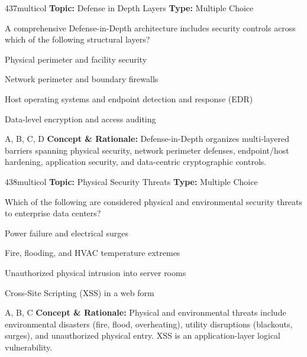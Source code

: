 \begin{qcard}{437}{multicol}
\textcolor{darkslate!75}{\small\textbf{Topic:} Defense in Depth Layers \hfill \textbf{Type:} Multiple Choice}\vspace{0.4em}\par
A comprehensive Defense-in-Depth architecture includes security controls across which of the following structural layers?
\begin{qoptions}
\item Physical perimeter and facility security
\item Network perimeter and boundary firewalls
\item Host operating systems and endpoint detection and response (EDR)
\item Data-level encryption and access auditing
\end{qoptions}
\end{qcard}
\nopagebreak
\begin{explainbox}{A, B, C, D}
\textbf{Concept \& Rationale:} Defense-in-Depth organizes multi-layered barriers spanning physical security, network perimeter defenses, endpoint/host hardening, application security, and data-centric cryptographic controls.
\end{explainbox}

\begin{qcard}{438}{multicol}
\textcolor{darkslate!75}{\small\textbf{Topic:} Physical Security Threats \hfill \textbf{Type:} Multiple Choice}\vspace{0.4em}\par
Which of the following are considered physical and environmental security threats to enterprise data centers?
\begin{qoptions}
\item Power failure and electrical surges
\item Fire, flooding, and HVAC temperature extremes
\item Unauthorized physical intrusion into server rooms
\item Cross-Site Scripting (XSS) in a web form
\end{qoptions}
\end{qcard}
\nopagebreak
\begin{explainbox}{A, B, C}
\textbf{Concept \& Rationale:} Physical and environmental threats include environmental disasters (fire, flood, overheating), utility disruptions (blackouts, surges), and unauthorized physical entry. XSS is an application-layer logical vulnerability.
\end{explainbox}

